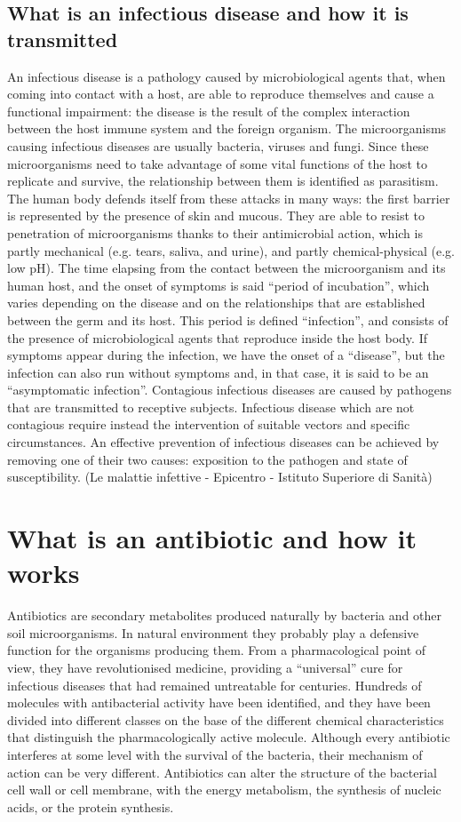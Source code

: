 \documentclass[11pt]{report}
\begin{document}
\section{What is an infectious disease and how it is transmitted}

An infectious disease is a pathology caused by microbiological agents that, when coming into contact with a host, are able to reproduce themselves and cause a functional impairment: the disease is the result of the complex interaction between the host immune system and the foreign organism. 
The microorganisms causing infectious diseases are usually bacteria, viruses and fungi. 
Since these microorganisms need to take advantage of some vital functions of the host to replicate and survive, the relationship between them is identified as parasitism.
The human body defends itself from these attacks in many ways: the first barrier is represented by the presence of skin and mucous. They are able to resist to penetration of microorganisms thanks to their antimicrobial action, which is partly mechanical (e.g. tears, saliva, and urine), and partly chemical-physical (e.g. low pH). 
The time elapsing from the contact between the microorganism and its human host, and the onset of symptoms is said “period of incubation”, which varies depending on the disease and on the relationships that are established between the germ and its host. 
This period is defined “infection”, and consists of the presence of microbiological agents that reproduce inside the host body.
If symptoms appear during the infection, we have the onset of a “disease”, but the infection can also run without symptoms and, in that case, it is said to be an “asymptomatic infection”.
Contagious infectious diseases are caused by pathogens that are transmitted to receptive subjects. 
Infectious disease which are not contagious require instead the intervention of suitable vectors and specific circumstances. 
An effective prevention of infectious diseases can be achieved by removing one of their two causes: exposition to the pathogen and state of susceptibility.
(Le malattie infettive - Epicentro - Istituto Superiore di Sanità)

\chapter{What is an antibiotic and how it works}
Antibiotics are secondary metabolites produced naturally by bacteria and other soil microorganisms. 
In natural environment they probably play a defensive function for the organisms producing them. 
From a pharmacological point of view, they have revolutionised medicine, providing a “universal” cure for infectious diseases that had remained untreatable for centuries. 
Hundreds of molecules with antibacterial activity have been identified, and they have been divided into different classes on the base of the different chemical characteristics that distinguish the pharmacologically active molecule. 
Although every antibiotic interferes at some level with the survival of the bacteria, their mechanism of action can be very different. 
Antibiotics can alter the structure of the bacterial cell wall or cell membrane, with the energy metabolism, the synthesis of nucleic acids, or the protein synthesis.
\end{document}
